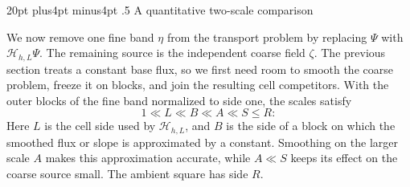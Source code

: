 \documentclass[11pt,reqno]{amsart}
\makeatletter
\def\section{\@startsection{section}{1}{0pt}%
  {20pt plus4pt minus4pt}
  {.5\linespacing}
  {\normalfont\bfseries}}
\theoremstyle{plain}
\theoremstyle{definition}
\theoremstyle{remark}
\numberwithin{equation}{section}
\newcommand{\1}{\mathbf 1}
\makeatother
\begin{document}
\section{A quantitative two-scale comparison}\label{sec:two-scale}

We now remove one fine band $\eta$ from the transport problem by
replacing $\Psi$ with $\mathcal H_{h,L}\Psi$.  The remaining source is
the independent coarse field $\zeta$.  The previous section treats a
constant base flux, so we first need room to smooth the coarse problem,
freeze it on blocks, and join the resulting cell competitors.
With the outer blocks of the fine band normalized to side one, the
scales satisfy
\[
1\ll L\ll B\ll A\ll S\leq R:
\]
Here $L$ is the cell side used by $\mathcal H_{h,L}$, and $B$ is the
side of a block on which the smoothed flux or slope is approximated by a
constant.  Smoothing on the larger scale $A$ makes this approximation
accurate, while $A\ll S$ keeps its effect on the coarse source small.
The ambient square has side $R$.
\end{document}
